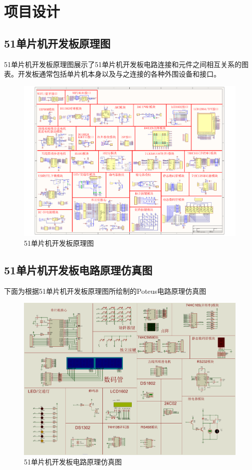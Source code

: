 \documentclass{textreportclass}  %
\begin{document}
	
\section{项目设计}				 			%
	
	\subsection{51单片机开发板原理图}		%
	51单片机开发板原理图展示了51单片机开发板电路连接和元件之间相互关系的图表。开发板通常包括单片机本身以及与之连接的各种外围设备和接口。
	
	\begin{figure}[htbp]
		\centering
		\includegraphics[scale=0.4]{Fig/开发板原理图.pdf}
		\caption{51单片机开发板原理图}\label{Fig.3}
	\end{figure}
	
	
	\subsection{51单片机开发板电路原理仿真图}	%
	下面为根据51单片机开发板原理图所绘制的Poteus电路原理仿真图
	\begin{figure}[htbp]
		\centering
		\includegraphics[scale=0.2]{Fig/学校51开发板仿真.PDF}
		\caption{51单片机开发板电路原理仿真图}\label{Fig.4}
	\end{figure}
	
\end{document}
